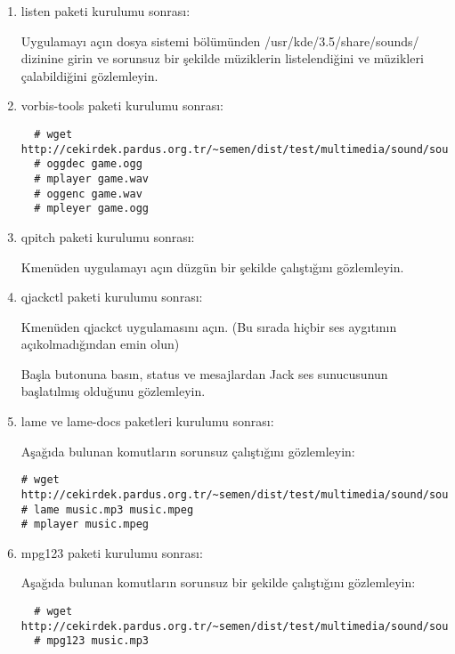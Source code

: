 \documentclass[a4paper,10pt]{article}
\begin{document}
\begin{enumerate}
\item listen paketi kurulumu sonrası: 

Uygulamayı açın dosya sistemi bölümünden /usr/kde/3.5/share/sounds/ dizinine girin ve sorunsuz bir şekilde müziklerin listelendiğini ve müzikleri çalabildiğini gözlemleyin.

\item vorbis-tools paketi kurulumu sonrası: 
 \begin{verbatim}
  # wget http://cekirdek.pardus.org.tr/~semen/dist/test/multimedia/sound/sound/game.ogg
  # oggdec game.ogg
  # mplayer game.wav
  # oggenc game.wav
  # mpleyer game.ogg
 \end{verbatim}

\item qpitch paketi kurulumu sonrası:

Kmenüden uygulamayı açın düzgün bir şekilde çalıştığını gözlemleyin.

\item qjackctl paketi kurulumu sonrası: 

Kmenüden qjackct uygulamasını açın. (Bu sırada hiçbir ses aygıtının açıkolmadığından emin olun)

Başla butonuna basın, status ve mesajlardan Jack ses sunucusunun başlatılmış olduğunu gözlemleyin.

\item lame ve lame-docs paketleri kurulumu sonrası: 

Aşağıda bulunan komutların sorunsuz çalıştığını gözlemleyin:
\begin{verbatim}
# wget http://cekirdek.pardus.org.tr/~semen/dist/test/multimedia/sound/sound/music.mp3
# lame music.mp3 music.mpeg
# mplayer music.mpeg
\end{verbatim}

\item mpg123 paketi kurulumu sonrası:

Aşağıda bulunan komutların sorunsuz bir şekilde çalıştığını gözlemleyin:
 \begin{verbatim}
  # wget http://cekirdek.pardus.org.tr/~semen/dist/test/multimedia/sound/sound/music.mp3
  # mpg123 music.mp3
 \end{verbatim}


\end{enumerate}
\end{document}
